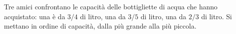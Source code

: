 Tre amici confrontano le capacità delle bottigliette di acqua 
che hanno acquistato: 
una è da $3/4$ di litro, una da $3/5$ di litro, una da $2/3$ di litro. 
Si mettano in ordine di capacità, dalla più grande alla più piccola.
